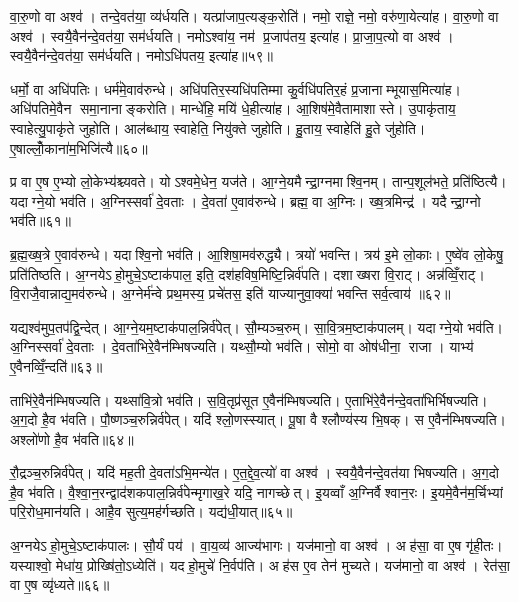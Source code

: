 वा॒रु॒णो वा अश्व॑। तन्दे॒वत॑या॒ व्य॑र्धयति। यत्प्रा॑जाप॒त्यङ्क॒रोति॑। नमो॒ राज्ञे॒ नमो॒ वरु॑णा॒येत्या॑ह। वा॒रु॒णो वा अश्व॑। स्वयै॒वैन॑न्दे॒वत॑या॒ सम॑र्धयति। नमोऽश्वा॑य॒ नम॑ प्र॒जाप॑तय॒ इत्या॑ह। प्रा॒जा॒प॒त्यो वा अश्व॑। स्वयै॒वैन॑न्दे॒वत॑या॒ सम॑र्धयति। नमोऽधि॑पतय॒ इत्या॑ह॥५९॥

धर्मो॒ वा अधि॑पतिः। धर्म॑मे॒वाव॑रुन्धे। अधि॑पतिर॒स्यधि॑पतिम्मा कु॒र्वधि॑पतिर॒हं प्र॒जानाम्भूयास॒मित्या॑ह। अधि॑पतिमे॒वैन समा॒नानाङ्करोति। मान्धे॑हि॒ मयि॑ धे॒हीत्या॑ह। आ॒शिष॑मे॒वैतामाशास्ते। उ॒पाकृ॑ताय॒ स्वाहेत्यु॒पाकृ॑ते जुहोति। आल॑ब्धाय॒ स्वाहेति॒ नियु॑क्ते जुहोति। हु॒ताय॒ स्वाहेति॑ हु॒ते जु॑होति। ए॒षाल्लोँ॒काना॑म॒भिजि॑त्यै॥६०॥

प्र वा ए॒ष ए॒भ्यो लो॒केभ्य॑श्च्यवते। योऽश्वमे॒धेन॒ यज॑ते। आ॒ग्ने॒यमैन्द्रा॒ग्नमाश्वि॒नम्। तान्प॒शूल॑भते॒ प्रति॑ष्ठित्यै। यदाग्ने॒यो भव॑ति। अ॒ग्निस्सर्वा॑ दे॒वताः। दे॒वता॑ ए॒वाव॑रुन्धे। ब्रह्म॒ वा अ॒ग्निः। ख्ष॒त्रमिन्द्र॑। यदैन्द्रा॒ग्नो भव॑ति॥६१॥

ब्र॒ह्म॒ख्ष॒त्रे ए॒वाव॑रुन्धे। यदाश्वि॒नो भव॑ति। आ॒शिषा॒मव॑रुद्ध्यै। त्रयो॑ भवन्ति। त्रय॑ इ॒मे लो॒काः। ए॒ष्वे॑व लो॒केषु॒ प्रति॑तिष्ठति। अ॒ग्नयेऽहो॒मुचे॒ऽष्टाक॑पाल॒ इति॒ दश॑हविष॒मिष्टि॒न्निर्व॑पति। दशाख्षरा वि॒राट्। अन्न॑व्विँ॒राट्। वि॒राजै॒वान्नाद्य॒मव॑रुन्धे। अ॒ग्नेर्म॑न्वे प्रथ॒मस्य॒ प्रचे॑तस॒ इति॑ याज्यानुवा॒क्या॑ भवन्ति सर्व॒त्वाय॑ ॥६२॥\anuvakamend[अधि॑पतय॒ इत्या॑हा॒भि॑जित्या ऐन्द्रा॒ग्नो भव॑ति रुन्ध॒ एक॑ञ्च]

यद्यश्व॑मुप॒तप॑द्वि॒न्देत्। आ॒ग्ने॒यम॒ष्टाक॑पाल॒न्निर्व॑पेत्। सौ॒म्यञ्च॒रुम्। सा॒वि॒त्रम॒ष्टाक॑पालम्। यदाग्ने॒यो भव॑ति। अ॒ग्निस्सर्वा॑ दे॒वताः। दे॒वता॑भिरे॒वैन॑म्भिषज्यति। यथ्सौ॒म्यो भव॑ति। सोमो॒ वा ओष॑धीना॒ राजा। याभ्य॑ ए॒वैनव्विँ॒न्दति॑॥६३॥

ताभि॑रे॒वैन॑म्भिषज्यति। यथ्सा॑वि॒त्रो भव॑ति। स॒वि॒तृप्र॑सूत ए॒वैन॑म्भिषज्यति। ए॒ताभि॑रे॒वैन॑न्दे॒वता॑भिर्भिषज्यति। अ॒ग॒दो है॒व भ॑वति। पौ॒ष्णञ्च॒रुन्निर्व॑पेत्। यदि॑ श्लो॒णस्स्यात्। पू॒षा वै श्लौण्य॑स्य भि॒षक्। स ए॒वैन॑म्भिषज्यति। अश्लो॑णो है॒व भ॑वति॥६४॥

रौ॒द्रञ्च॒रुन्निर्व॑पेत्। यदि॑ मह॒ती दे॒वता॑ऽभि॒मन्ये॑त। ए॒त॒द्दे॒व॒त्यो॑ वा अश्व॑। स्वयै॒वैन॑न्दे॒वत॑या भिषज्यति। अ॒ग॒दो है॒व भ॑वति। वै॒श्वा॒न॒रन्द्वाद॑शकपाल॒न्निर्व॑पेन्मृगाख॒रे यदि॒ नागच्छेत्। इ॒यव्वाँ अ॒ग्निर्वैश्वान॒रः। इ॒यमे॒वैन॑म॒र्चिभ्यां परि॒रोध॒मान॑यति। आहै॒व सुत्य॒मह॑र्गच्छति। यद्य॑धी॒यात्॥६५॥

अ॒ग्नयेऽहो॒मुचे॒ऽष्टाक॑पालः। सौ॒र्यं पय॑। वा॒य॒व्य॑ आज्य॑भागः। यज॑मानो॒ वा अश्व॑। अह॑सा॒ वा ए॒ष गृ॑ही॒तः। यस्याश्वो॒ मेधा॑य॒ प्रोख्षि॑तो॒ऽध्येति॑। यदहो॒मुचे॑ नि॒र्वप॑ति। अह॑स ए॒व तेन॑ मुच्यते। यज॑मानो॒ वा अश्व॑। रेत॑सा॒ वा ए॒ष व्यृ॑ध्यते॥६६॥

